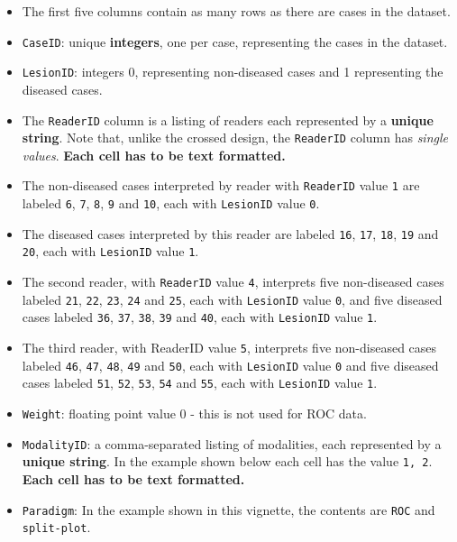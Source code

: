 \documentclass[
]{book}
\providecommand{\tightlist}{%
  \setlength{\itemsep}{0pt}\setlength{\parskip}{0pt}}
\begin{document}
\begin{itemize}
\tightlist
\item
  The first five columns contain as many rows as there are cases in the dataset.
\item
  \texttt{CaseID}: unique \textbf{integers}, one per case, representing the cases in the dataset.
\item
  \texttt{LesionID}: integers 0, representing non-diseased cases and 1 representing the diseased cases.
\item
  The \texttt{ReaderID} column is a listing of readers each represented by a \textbf{unique string}. Note that, unlike the crossed design, the \texttt{ReaderID} column has \emph{single values}. \textbf{Each cell has to be text formatted.}
\item
  The non-diseased cases interpreted by reader with \texttt{ReaderID} value \texttt{1} are labeled \texttt{6}, \texttt{7}, \texttt{8}, \texttt{9} and \texttt{10}, each with \texttt{LesionID} value \texttt{0}.
\item
  The diseased cases interpreted by this reader are labeled \texttt{16}, \texttt{17}, \texttt{18}, \texttt{19} and \texttt{20}, each with \texttt{LesionID} value \texttt{1}.\\
\item
  The second reader, with \texttt{ReaderID} value \texttt{4}, interprets five non-diseased cases labeled \texttt{21}, \texttt{22}, \texttt{23}, \texttt{24} and \texttt{25}, each with \texttt{LesionID} value \texttt{0}, and five diseased cases labeled \texttt{36}, \texttt{37}, \texttt{38}, \texttt{39} and \texttt{40}, each with \texttt{LesionID} value \texttt{1}.\\
\item
  The third reader, with ReaderID value \texttt{5}, interprets five non-diseased cases labeled \texttt{46}, \texttt{47}, \texttt{48}, \texttt{49} and \texttt{50}, each with \texttt{LesionID} value \texttt{0} and five diseased cases labeled \texttt{51}, \texttt{52}, \texttt{53}, \texttt{54} and \texttt{55}, each with \texttt{LesionID} value \texttt{1}.\\
\item
  \texttt{Weight}: floating point value 0 - this is not used for ROC data.\\
\item
  \texttt{ModalityID}: a comma-separated listing of modalities, each represented by a \textbf{unique string}. In the example shown below each cell has the value \texttt{1,\ 2}. \textbf{Each cell has to be text formatted.}
\item
  \texttt{Paradigm}: In the example shown in this vignette, the contents are \texttt{ROC} and \texttt{split-plot}.
\end{itemize}
\end{document}
